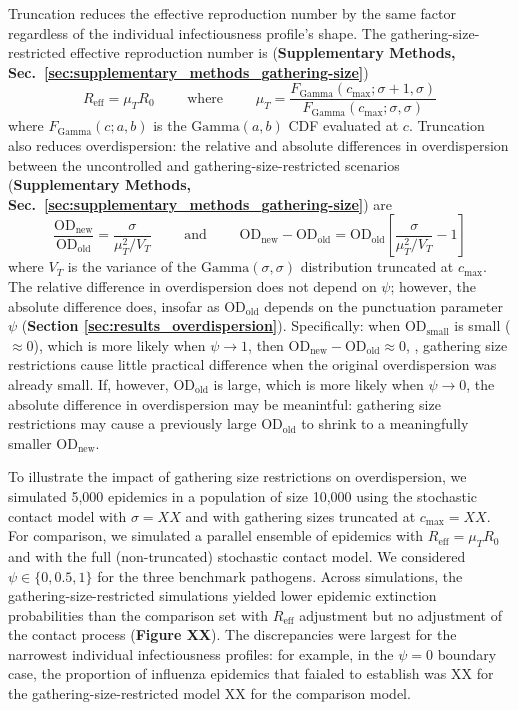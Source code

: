 Truncation reduces the effective reproduction number by the same factor regardless of the individual infectiousness profile's shape. The gathering-size-restricted effective reproduction number is ({\bf Supplementary Methods, Sec.~\ref{sec:supplementary_methods_gathering-size}})
\begin{equation}
	R_\text{eff} = \mu_T R_0 \qquad \text{ where } \qquad \mu_T = \frac{F_\text{Gamma}(c_\text{max}; \sigma+1, \sigma)}{F_\text{Gamma}(c_\text{max}; \sigma, \sigma)}
\end{equation}
where $F_\text{Gamma}(c;a,b)$ is the $\text{Gamma}(a,b)$ CDF evaluated at $c$. Truncation also reduces overdispersion: the relative and absolute differences in overdispersion between the uncontrolled and gathering-size-restricted scenarios ({\bf Supplementary Methods, Sec.~\ref{sec:supplementary_methods_gathering-size}}) are 
\begin{equation}
	\frac{\text{OD}_\text{new}}{\text{OD}_\text{old}} = \frac{\sigma}{\mu_T^2 / V_T}
	\qquad \text{ and } \qquad 
	\text{OD}_\text{new} - \text{OD}_\text{old} = \text{OD}_\text{old} \left[ \frac{\sigma}{\mu_T^2 / V_T} - 1\right]
\end{equation}
where $V_T$ is the variance of the $\text{Gamma}(\sigma,\sigma)$ distribution truncated at $c_\text{max}$. The relative difference in overdispersion does not depend on $\psi$; however, the absolute difference does, insofar as $\text{OD}_\text{old}$ depends on the punctuation parameter $\psi$ ({\bf Section \ref{sec:results_overdispersion}}). Specifically: when $\text{OD}_\text{small}$ is small ($\approx 0$), which is more likely when $\psi \rightarrow 1$, then $\text{OD}_\text{new} - \text{OD}_\text{old} \approx 0$, \ie, gathering size restrictions cause little practical difference when the original overdispersion was already small. If, however, $\text{OD}_\text{old}$ is large, which is more likely when $\psi \rightarrow 0$, the absolute difference in overdispersion may be meanintful: gathering size restrictions may cause a previously large $\text{OD}_\text{old}$ to shrink to a meaningfully smaller $\text{OD}_\text{new}$. 

To illustrate the impact of gathering size restrictions on overdispersion, we simulated 5,000 epidemics in a population of size 10,000 using the stochastic contact model with $\sigma = XX$ and with gathering sizes truncated at $c_\text{max} = XX$. For comparison, we simulated a parallel ensemble of epidemics with $R_\text{eff} = \mu_T R_0$ and with the full (non-truncated) stochastic contact model. We considered $\psi \in \{0, 0.5, 1\}$ for the three benchmark pathogens. Across simulations, the gathering-size-restricted simulations yielded lower epidemic extinction probabilities than the comparison set with $R_\text{eff}$ adjustment but no adjustment of the contact process ({\bf Figure XX}). The discrepancies were largest for the narrowest individual infectiousness profiles: for example, in the $\psi = 0$ boundary case, the proportion of influenza epidemics that faialed to establish was XX for the gathering-size-restricted model \vs XX for the comparison model. 

